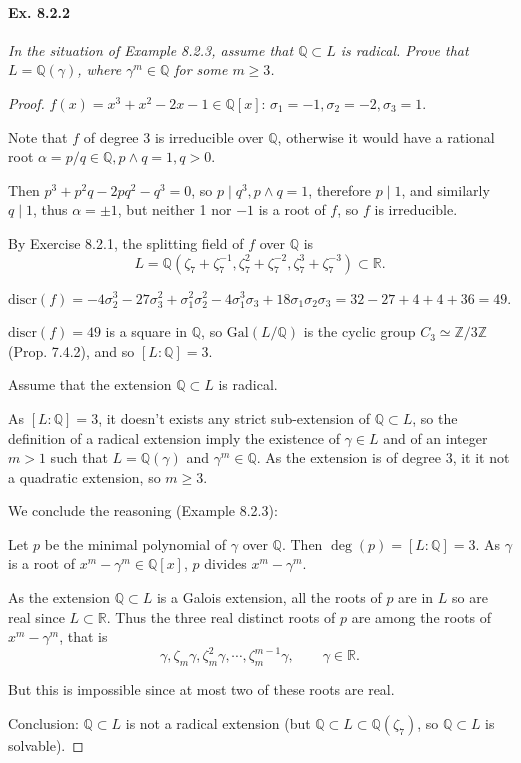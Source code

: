 \documentclass[11pt,a4paper]{article}
\newcommand{\Q}{\mathbb{Q}}
\newcommand{\R}{\mathbb{R}}
\begin{document}
\paragraph{Ex. 8.2.2} 

{\it In the situation of Example 8.2.3, assume that $\Q \subset L$ is radical. Prove that $L = \Q(\gamma)$, where $\gamma^m \in \Q$ for some $m\geq 3$.
}

\begin{proof}
$f(x) = x^3+x^2-2x-1 \in \mathbb{Q}[x]$: $\sigma_1=-1,\sigma_2=-2,\sigma_3=1$.

Note that $f$ of degree 3 is irreducible over $\mathbb{Q}$, otherwise it would have a rational root  $\alpha =p/q \in \mathbb{Q}, p \wedge q = 1,q>0$. 

Then $p^3 + p^2 q - 2 pq^2-q^3 = 0$, so $p\mid q^3,p\wedge q = 1$, therefore $p\mid 1$, and similarly $q \mid 1$, thus $\alpha = \pm1$, but neither 1 nor $-1$ is a root of $f$, so $f$ is irreducible.

By Exercise 8.2.1,  the splitting field of $f$ over $\Q$ is
 $$L = \mathbb{Q}(\zeta_7+\zeta_7^{-1},\zeta_7^2+\zeta_7^{-2},\zeta_7^3+\zeta_7^{-3})\subset \R.$$

$\mathrm{discr}(f) = -4\sigma_2^3-27\sigma_3^2+\sigma_1^2\sigma_2^2-4\sigma_1^3\sigma_3+18\sigma_1\sigma_2\sigma_3 = 32-27+4+4+36 = 49$.

$\mathrm{discr}(f) =49$ is a square in $\mathbb{Q}$, so $\mathrm{Gal}(L/ \mathbb{Q})$ is the cyclic group $C_3 \simeq \mathbb{Z}/3\mathbb{Z}$ (Prop. 7.4.2), and so $[L : \mathbb{Q}] = 3$.

Assume that the extension $\mathbb{Q}\subset L$ is radical.

As  $[L : \mathbb{Q}] = 3$, it doesn't exists any strict sub-extension of $\mathbb{Q}\subset L$, so the definition of a radical extension imply the existence of $\gamma \in L$ and of an integer $m > 1$  such that $L = \mathbb{Q}(\gamma)$ and $\gamma^m \in \mathbb{Q}$. As the extension is of degree 3, it it not a quadratic extension, so $m\geq 3$.

We conclude the reasoning (Example 8.2.3):

Let $p$ be the minimal polynomial of $\gamma$ over $\mathbb{Q}$. Then $\deg(p) = [L:\mathbb{Q}] = 3$.  As $\gamma$ is a root of $x^m - \gamma^m \in \mathbb{Q}[x]$, $p$ divides $x^m - \gamma^m$.

As the extension $\mathbb{Q} \subset L$ is a Galois extension, all the roots of $p$ are in $L$ so are real since $L \subset \R$. Thus the three real distinct roots of $p$ are among the roots of $x^m- \gamma^m$, that is $$\gamma, \zeta_m \gamma,\zeta_m^2 \gamma,\cdots,\zeta_m^{m-1} \gamma,\qquad \gamma \in \mathbb{R}.$$

But this is impossible since at most two of these roots are real.

Conclusion: $\mathbb{Q}\subset L$ is not a radical extension (but $\mathbb{Q} \subset L \subset \mathbb{Q}(\zeta_7)$, so $\mathbb{Q} \subset L$ is solvable).
\end{proof}
\end{document}
